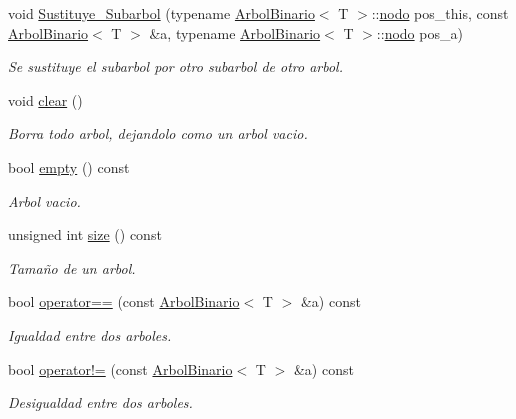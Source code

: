 \begin{DoxyCompactItemize}
\item 
void \hyperlink{classArbolBinario_a9afe576ade74a09a9b19fb0874749cdb}{Sustituye\+\_\+\+Subarbol} (typename \hyperlink{classArbolBinario}{Arbol\+Binario}$<$ T $>$\+::\hyperlink{classArbolBinario_1_1nodo}{nodo} pos\+\_\+this, const \hyperlink{classArbolBinario}{Arbol\+Binario}$<$ T $>$ \&a, typename \hyperlink{classArbolBinario}{Arbol\+Binario}$<$ T $>$\+::\hyperlink{classArbolBinario_1_1nodo}{nodo} pos\+\_\+a)
\begin{DoxyCompactList}\small\item\em Se sustituye el subarbol por otro subarbol de otro arbol. \end{DoxyCompactList}\item 
\mbox{\label{classArbolBinario_a667e476cc2058a4edbafa546bba5ec0f}} 
void \hyperlink{classArbolBinario_a667e476cc2058a4edbafa546bba5ec0f}{clear} ()
\begin{DoxyCompactList}\small\item\em Borra todo arbol, dejandolo como un arbol vacio. \end{DoxyCompactList}\item 
bool \hyperlink{classArbolBinario_a574a76889f9bb8a80080288a16f9441f}{empty} () const
\begin{DoxyCompactList}\small\item\em Arbol vacio. \end{DoxyCompactList}\item 
unsigned int \hyperlink{classArbolBinario_a3df34c7cbcbaa42b68884e5fcde93334}{size} () const
\begin{DoxyCompactList}\small\item\em Tamaño de un arbol. \end{DoxyCompactList}\item 
bool \hyperlink{classArbolBinario_a238f5acc35279cca386b0b68ae20de42}{operator==} (const \hyperlink{classArbolBinario}{Arbol\+Binario}$<$ T $>$ \&a) const
\begin{DoxyCompactList}\small\item\em Igualdad entre dos arboles. \end{DoxyCompactList}\item 
bool \hyperlink{classArbolBinario_ac773f91e274ab6ec695492e5dfea4fff}{operator!=} (const \hyperlink{classArbolBinario}{Arbol\+Binario}$<$ T $>$ \&a) const
\begin{DoxyCompactList}\small\item\em Desigualdad entre dos arboles. \end{DoxyCompactList}\item 

\end{DoxyCompactItemize}
